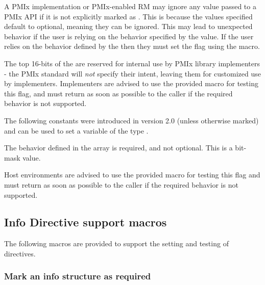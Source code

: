 \adviceuserstart
A PMIx implementation or PMIx-enabled \ac{RM} may ignore any  value passed to a \ac{PMIx} \ac{API} if it is not explicitly marked as .
This is because the values specified default to optional, meaning they can be ignored.
This may lead to unexpected behavior if the user is relying on the behavior specified by the  value.
If the user relies on the behavior defined by the  then they must set the  flag using the  macro.
\adviceuserend

\adviceimplstart
The top 16-bits of the  are reserved for internal use by \ac{PMIx} library implementers - the \ac{PMIx} standard will \textit{not} specify their intent, leaving them for customized use by implementers. Implementers are advised to use the provided  macro for testing this flag, and must return  as soon as possible to the caller if the required behavior is not supported.
\adviceimplend

The following constants were introduced in version 2.0 (unless otherwise marked) and can be used to set a variable of the type .

\begin{constantdesc}
%
The behavior defined in the  array is required, and not optional. This is a bit-mask value.
%
\end{constantdesc}

\advicermstart
Host environments are advised to use the provided  macro for testing this flag and must return  as soon as possible to the caller if the required behavior is not supported.
\advicermend


\subsection{Info Directive support macros}

The following macros are provided to support the setting and testing of  directives.

\subsubsection{Mark an info structure as required}

